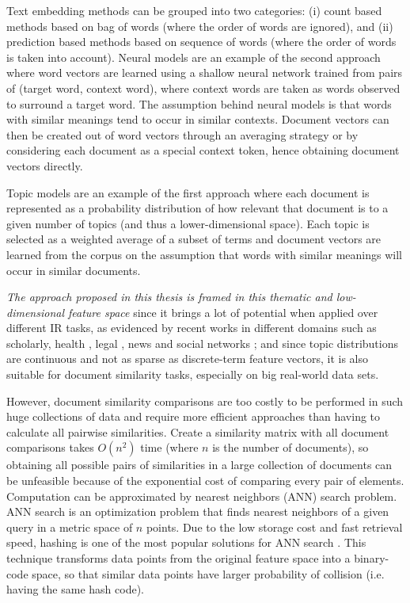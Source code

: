 Text embedding methods can be grouped into two categories: (i) count based methods based on bag of words (where the order of words are ignored), and (ii) prediction based methods based on sequence of words (where the order of words is taken into account). Neural models are an example of the second approach where word vectors are learned using a shallow neural network trained from pairs of (target word, context word), where context words are taken as words observed to surround a target word. The assumption behind neural models is that words with similar meanings tend to occur in similar contexts. Document vectors can then be created out of word vectors through an averaging strategy or by considering each document as a special context token, hence obtaining document vectors directly. 

Topic models are an example of the first approach where each document is represented as a probability distribution of how relevant that document is to a given number of topics (and thus a lower-dimensional space). Each topic is selected as a weighted average of a subset of terms and document vectors are learned from the corpus on the assumption that words with similar meanings will occur in similar documents.

\textit{The approach proposed in this thesis is framed in this thematic and low-dimensional feature space} since it brings a lot of potential when applied over different IR tasks, as evidenced by recent works in different domains such as scholarly\cite{Gatti2015}, health \cite{Lu2016} \cite{TapiNzali2017}, legal \cite{ONeill2017}\cite{Greene2016}, news \cite{He2017} and social networks \cite{Cheng2014a}; and since topic distributions are continuous and not as sparse as discrete-term feature vectors, it is also suitable for document similarity tasks, especially on big real-world data sets. 



However, document similarity comparisons are too costly to be performed in such huge collections of data and require more efficient approaches than having to calculate all pairwise similarities. Create a similarity matrix with all document comparisons takes $O(n^2)$ time (where $n$ is the number of documents), so obtaining all possible pairs of similarities in a large collection of documents can be unfeasible because of the exponential cost of comparing every pair of elements. Computation can be approximated by nearest neighbors (ANN) search problem. ANN search is an optimization problem that finds nearest neighbors of a given query in a metric space of $n$ points. Due to the low storage cost and fast retrieval speed, hashing is one of the most popular solutions for ANN search \cite{Liu2014a} \cite{Andoni2013} \cite{Zhen2016}. This technique transforms data points from the original feature space into a binary-code space, so that similar data points have larger probability of collision (i.e. having the same hash code). 

